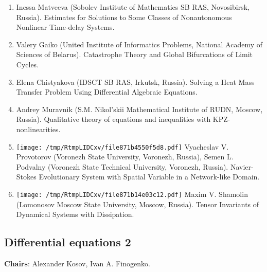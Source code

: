\documentclass[
]{article}
\providecommand{\tightlist}{%
  \setlength{\itemsep}{0pt}\setlength{\parskip}{0pt}}
\begin{document}
\begin{enumerate}
\def\labelenumi{\arabic{enumi}.}
\tightlist
\item
  Inessa Matveeva (Sobolev Institute of Mathematics SB RAS, Novosibirsk,
  Russia). Estimates for Solutions to Some Classes of Nonautonomous
  Nonlinear Time-delay Systems.
\item
  Valery Gaiko (United Institute of Informatics Problems, National
  Academy of Sciences of Belarus). Catastrophe Theory and Global
  Bifurcations of Limit Cycles.
\item
  Elena Chistyakova (IDSCT SB RAS, Irkutsk, Russia). Solving a Heat Mass
  Transfer Problem Using Differential Algebraic Equations.
\item
  Andrey Muravnik (S.M. Nikol'skii Mathematical Institute of RUDN,
  Moscow, Russia). Qualitative theory of equations and inequalities with
  KPZ-nonlinearities.
\item
  \protect\texttt{[image: /tmp/RtmpLIDCxv/file871b4550f5d8.pdf]}
  Vyacheslav V. Provotorov (Voronezh State University, Voronezh,
  Russia), Semen L. Podvalny (Voronezh State Technical University,
  Voronezh, Russia). Navier-Stokes Evolutionary System with Spatial
  Variable in a Network-like Domain.
\item
  \protect\texttt{[image: /tmp/RtmpLIDCxv/file871b14e03c12.pdf]}
  Maxim V. Shamolin (Lomonosov Moscow State University, Moscow, Russia).
  Tensor Invariants of Dynamical Systems with Dissipation.
\end{enumerate}

\hypertarget{de2}{%
\subsection{Differential equations 2}\label{de2}}

\textbf{Chairs}: Alexander Kosov, Ivan A. Finogenko.
\end{document}
